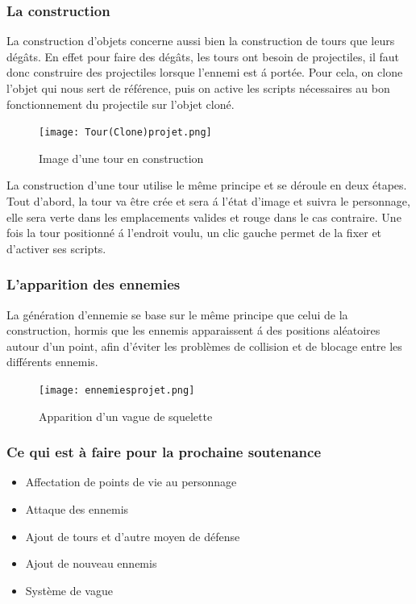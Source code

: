 \documentclass[a4paper, 12pt]{article}
\begin{document}
		\subsubsection{La construction}
		La construction d'objets concerne aussi bien la construction de tours que leurs dégâts. En effet pour faire des dégâts, les tours ont besoin de projectiles, il faut donc construire des projectiles lorsque l'ennemi est \'a portée. Pour cela, on clone l'objet qui nous sert de référence, puis on active les scripts nécessaires au bon fonctionnement du projectile sur l'objet cloné.
	\begin{figure}[!ht]	
		\centerline{\texttt{[image: Tour(Clone)projet.png]}}	
		\caption*{Image d'une tour en construction}	
	\end{figure}
		
		\par La construction d'une tour utilise le même principe et se déroule en deux étapes. Tout d'abord, la tour va être crée et sera \'a l'état d'image et suivra le personnage, elle sera verte dans les emplacements valides et rouge dans le cas contraire. Une fois la tour positionné \'a l'endroit voulu, un clic gauche permet de la fixer et d'activer ses scripts.
		
		
		\subsubsection{L'apparition des ennemies}
	
		La génération d'ennemie se base sur le même principe que celui de la construction, hormis que les ennemis apparaissent \'a des positions aléatoires autour d'un point, afin d'éviter les problèmes de collision et de blocage entre les différents ennemis. \\
	\begin{figure}[!ht]
		\centerline{\texttt{[image: ennemiesprojet.png]}}
		\caption*{Apparition d'un vague de squelette}
	\end{figure}

	\subsubsection*{Ce qui est à faire pour la prochaine soutenance}	
	\begin{itemize}
	\item Affectation de points de vie au personnage
	\item Attaque des ennemis
	\item Ajout de tours et d'autre moyen de d\'efense
	\item Ajout de nouveau ennemis 
	\item Système de vague
	\end{itemize}
\end{document}
